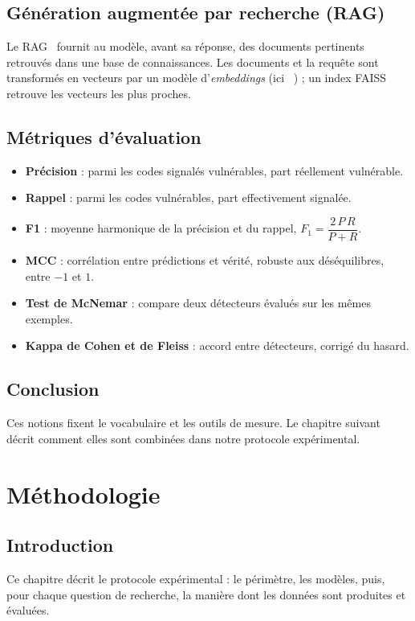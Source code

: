 \documentclass[11pt,a4paper,oneside]{report}
\newcommand{\code}[1]{\texttt{\detokenize{#1}}}
\newcommand{\chapintro}{\section*{Introduction}}
\newcommand{\chapconclusion}{\section*{Conclusion}}
\begin{document}
\section{Génération augmentée par recherche (RAG)}
Le RAG~\cite{rag} fournit au modèle, avant sa réponse, des documents pertinents retrouvés dans une base de connaissances. Les documents et la requête sont transformés en vecteurs par un modèle d'\emph{embeddings} (ici \code{bge-small-en-v1.5}~\cite{bge}) ; un index FAISS~\cite{faiss} retrouve les vecteurs les plus proches.

\section{Métriques d'évaluation}
\begin{itemize}
  \item \textbf{Précision} : parmi les codes signalés vulnérables, part réellement vulnérable.
  \item \textbf{Rappel} : parmi les codes vulnérables, part effectivement signalée.
  \item \textbf{F1} : moyenne harmonique de la précision et du rappel, $F_1 = \dfrac{2\,P\,R}{P + R}$.
  \item \textbf{MCC} : corrélation entre prédictions et vérité, robuste aux déséquilibres, entre $-1$ et $1$.
  \item \textbf{Test de McNemar} : compare deux détecteurs évalués sur les mêmes exemples.
  \item \textbf{Kappa de Cohen et de Fleiss} : accord entre détecteurs, corrigé du hasard.
\end{itemize}

\chapconclusion
Ces notions fixent le vocabulaire et les outils de mesure. Le chapitre suivant décrit comment elles sont combinées dans notre protocole expérimental.

\chapter{Méthodologie}\label{chap:methodo}
\chapintro
Ce chapitre décrit le protocole expérimental : le périmètre, les modèles, puis, pour chaque question de recherche, la manière dont les données sont produites et évaluées.
\end{document}
